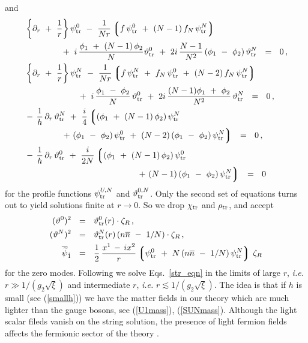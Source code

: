 \documentclass[12pt]{article}
\newcommand{\p}{\partial}
\newcommand{\wt}{\widetilde}
\newcommand{\ov}{\overline}
\newcommand{\lgr}{\left\lgroup}
\newcommand{\rgr}{\right\rgroup}
\newcommand{\zr}{\zeta_R}
\newcommand{\nbar}{\ov{n}}
\newcommand{\pts}{\psi_{\rm tr}^0}
\newcommand{\ptN}{\psi_{\rm tr}^N}
\newcommand{\tts}{\vartheta_{\rm tr}^0}
\newcommand{\ttN}{\vartheta_{\rm tr}^N}
\begin{document}
	and 
\begin{align}
\label{str_eqn}
%
\notag
	&
	\left\{ \p_r ~+~ \frac{1}{r} \right\} \pts ~-~ \frac{1}{Nr}\lgr f\,\pts ~+~ (N-1)\, f_N\, \ptN \rgr \\
\notag
	&
	\qquad\qquad
		~+~ i\, \frac{ \phi_1 ~+~ (N-1)\,\phi_2}{N} \tts 
		~+~ 2i\, \frac{N-1}{N^2}\, (\phi_1 ~-~ \phi_2)\, \ttN ~~=~~ 0\,,
\\
%
\notag
	&
	\left\{ \p_r ~+~ \frac{1}{r} \right\} \ptN ~-~ \frac{1}{Nr} \lgr f\, \ptN ~+~ f_N\, \pts ~+~ (N-2)\,f_N\,\ptN \rgr \\
	& 
	\qquad\qquad\qquad
		~+~ i\, \frac{\phi_1 ~-~ \phi_2}{N}\, \tts 
		~+~ 2i\, \frac{(N-1)\phi_1 ~+~ \phi_2}{N^2}\, \ttN ~~=~~ 0\,,
\\
%
\notag
	&
	-\,\frac{1}{h}\, \p_r\, \ttN 
		~+~ \frac{i}{4} \lgr (\phi_1 ~+~ (N-1)\,\phi_2)\,\ptN \right. \\
\notag
	&
	\qquad\qquad
		\left.
		~+~ (\phi_1~-~\phi_2)\,\pts ~+~ (N-2)\,(\phi_1~-~\phi_2)\,\ptN \rgr ~~=~~ 0\,,
\\
%
\notag
	&
	-\,\frac{1}{h}\, \p_r\, \tts 
		~+~ \frac{i}{2N} \lgr (\phi_1 ~+~ (N-1)\,\phi_2)\,\pts \right. \\
\notag
	&
	\qquad\qquad\qquad\qquad\qquad\qquad\quad
		\left.
		~+~ (N-1)\,(\phi_1~-~\phi_2)\,\ptN \rgr ~~=~~0
\end{align}
	for the profile functions $ \psi_{\rm tr}^{U,N} $ and $ \vartheta_{\rm tr}^{0,N} $.
	Only the second set of equations turns out to yield solutions finite at $ r \to 0 $.
	So we drop $ \chi_{\rm tr} $ and $ \rho_{\rm tr} $, and accept
\begin{align}
%
\notag
	(\vartheta^0)^2 & ~~=~~ \tts(r) \cdot \zr\,,
\\
%
\label{tr_anz}
	(\vartheta^N)^2 & ~~=~~ \ttN(r)\, (n\nbar ~-~ 1/N) \cdot \zr\,,
\\
%
\notag
	\ov{\wt{\psi}}{}_{\dot 1} & ~~=~~ \frac{1}{2}\, \frac{x^1 \,-\, ix^2}{r} 
						\lgr \pts ~+~ N\,(n\nbar ~-~ 1/N)\, \ptN \rgr \, \zr
\end{align}
	for the zero modes.
	Following \cite{GSYmmodel,BSYhet} we solve Eqs.~\eqref{str_eqn} in the limits of large $r$, {\em i.e.}
	$ r \gg 1/(g_2\sqrt{\xi}) $ and intermediate $r$, {\em i.e.} $ r \lesssim 1/(g_2\sqrt{\xi}) $.
 The idea is that if $h$ is small (see (\ref{smallh})) we have the  matter fields in our theory
which are much lighter than the gauge bosons, see (\ref{U1mass}), (\ref{SUNmass}). 
Although the light scalar fileds vanish on the string solution, 
the presence of light fermion fields affects the fermionic sector of the theory \cite{SYnone,SYhet}.
\end{document}
